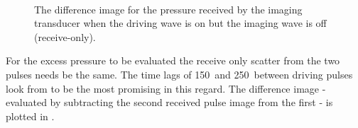 \begin{figure}[t]%
  \centering
 \quad
  \\
 \quad
\caption{
    The difference image for the pressure received  by the imaging transducer when the driving wave is on but the imaging wave is off (receive-only).
  }
  \label{fig:exp:control:av:time:diff}
\end{figure}


For the excess pressure to be evaluated the receive only scatter from the two pulses needs be the same.
The time lags of \unit{150}\micro\second\ and \unit{250}\micro\second\  between driving pulses 
look from 
to be the most promising in this regard.
The difference image 
- evaluated by subtracting the second received pulse image from the first -
is plotted in .


